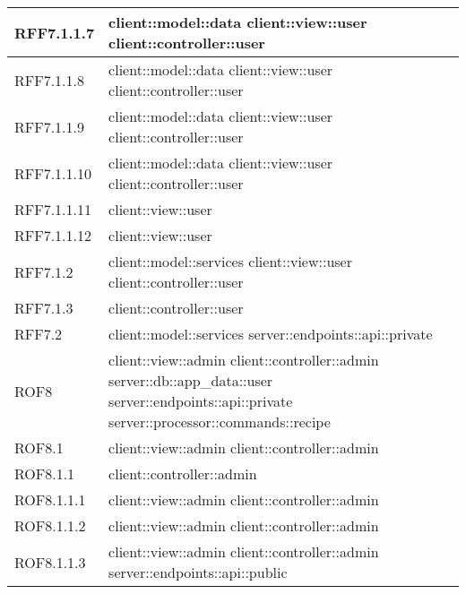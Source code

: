 \begin{center}
\begin{longtable}{| p{4cm} | p{8cm} |}
\hline
RFF7.1.1.7 & client::model::data \newline client::view::user \newline client::controller::user \\
\hline
RFF7.1.1.8 & client::model::data \newline client::view::user \newline client::controller::user \\
\hline
RFF7.1.1.9 & client::model::data \newline client::view::user \newline client::controller::user \\
\hline
RFF7.1.1.10 & client::model::data \newline client::view::user \newline client::controller::user \\
\hline
RFF7.1.1.11 & client::view::user \\
\hline
RFF7.1.1.12 & client::view::user \\
\hline
RFF7.1.2 & client::model::services \newline client::view::user \newline client::controller::user \\
\hline
RFF7.1.3 & client::controller::user \\
\hline
RFF7.2 & client::model::services \newline server::endpoints::api::private \\
\hline
ROF8 & client::view::admin \newline client::controller::admin \newline server::db::app\_data::user \newline server::endpoints::api::private \newline server::processor::commands::recipe \\
\hline
ROF8.1 & client::view::admin \newline client::controller::admin \\
\hline
ROF8.1.1 & client::controller::admin \\
\hline
ROF8.1.1.1 & client::view::admin \newline client::controller::admin \\
\hline
ROF8.1.1.2 & client::view::admin \newline client::controller::admin \\
\hline
ROF8.1.1.3 & client::view::admin \newline client::controller::admin \newline server::endpoints::api::public \\

\end{longtable}
\end{center}
